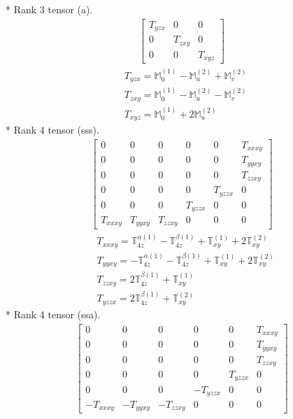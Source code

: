 \documentclass[fleqn,8pt,landscape]{jsarticle}
\begin{document}
* Rank 3 tensor (a).
\begin{align*}
\begin{bmatrix} T_{yzx} & 0 & 0 \\ 0 & T_{zxy} & 0 \\ 0 & 0 & T_{xyz} \end{bmatrix}
\end{align*}
\begin{align*}
& T_{yzx} = \mathbb{M}_{0}^{(1)} - \mathbb{M}_{u}^{(2)} + \mathbb{M}_{v}^{(2)} \\
& T_{zxy} = \mathbb{M}_{0}^{(1)} - \mathbb{M}_{u}^{(2)} - \mathbb{M}_{v}^{(2)} \\
& T_{xyz} = \mathbb{M}_{0}^{(1)} + 2 \mathbb{M}_{u}^{(2)}
\end{align*}
* Rank 4 tensor (sss).
\begin{align*}
\begin{bmatrix} 0 & 0 & 0 & 0 & 0 & T_{xxxy} \\ 0 & 0 & 0 & 0 & 0 & T_{yyxy} \\ 0 & 0 & 0 & 0 & 0 & T_{zzxy} \\ 0 & 0 & 0 & 0 & T_{yzzx} & 0 \\ 0 & 0 & 0 & T_{yzzx} & 0 & 0 \\ T_{xxxy} & T_{yyxy} & T_{zzxy} & 0 & 0 & 0 \end{bmatrix}
\end{align*}
\begin{align*}
& T_{xxxy} = \mathbb{T}_{4z}^{\alpha(1)} - \mathbb{T}_{4z}^{\beta(1)} + \mathbb{T}_{xy}^{(1)} + 2 \mathbb{T}_{xy}^{(2)} \\
& T_{yyxy} = - \mathbb{T}_{4z}^{\alpha(1)} - \mathbb{T}_{4z}^{\beta(1)} + \mathbb{T}_{xy}^{(1)} + 2 \mathbb{T}_{xy}^{(2)} \\
& T_{zzxy} = 2 \mathbb{T}_{4z}^{\beta(1)} + \mathbb{T}_{xy}^{(1)} \\
& T_{yzzx} = 2 \mathbb{T}_{4z}^{\beta(1)} + \mathbb{T}_{xy}^{(2)}
\end{align*}
* Rank 4 tensor (ssa).
\begin{align*}
\begin{bmatrix} 0 & 0 & 0 & 0 & 0 & T_{xxxy} \\ 0 & 0 & 0 & 0 & 0 & T_{yyxy} \\ 0 & 0 & 0 & 0 & 0 & T_{zzxy} \\ 0 & 0 & 0 & 0 & T_{yzzx} & 0 \\ 0 & 0 & 0 & - T_{yzzx} & 0 & 0 \\ - T_{xxxy} & - T_{yyxy} & - T_{zzxy} & 0 & 0 & 0 \end{bmatrix}
\end{align*}
\end{document}
